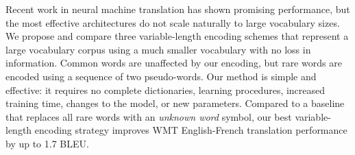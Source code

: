 Recent work in neural machine translation has shown promising performance, but
the most effective architectures do not scale naturally to large vocabulary
sizes. We propose and compare three variable-length encoding schemes that
represent a large vocabulary corpus using a much smaller vocabulary with no
loss in information. Common words are unaffected by our encoding, but rare
words are encoded using a sequence of two pseudo-words. Our method is simple
and effective: it requires no complete dictionaries, learning procedures,
increased training time, changes to the model, or new parameters. Compared to a
baseline that replaces all rare words with an \emph{unknown word} symbol, our
best variable-length encoding strategy improves WMT English-French translation
performance by up to 1.7 BLEU.
